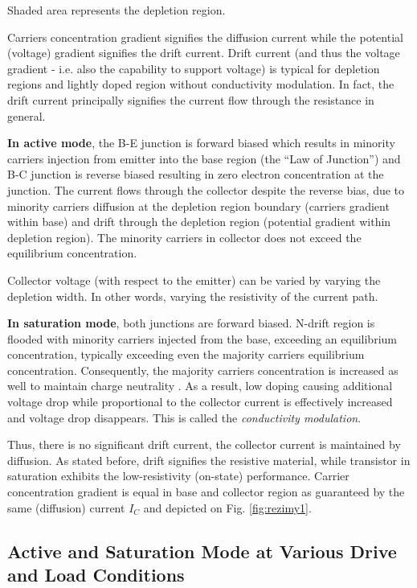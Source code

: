 \documentclass[conference]{IEEEtran}
\begin{document}
Shaded area represents the depletion region.

Carriers concentration gradient  signifies the diffusion current while the potential (voltage) gradient signifies the drift current. Drift current (and thus the voltage gradient - i.e. also the capability to support voltage) is typical for depletion regions and lightly doped region without conductivity modulation. In fact, the drift current principally signifies the current flow through the resistance in general.

\textbf{In active mode}, the B-E junction is forward biased which results in minority carriers injection from emitter into the base region (the ``Law of Junction'') and B-C junction is reverse biased resulting in zero electron concentration at the junction. The current flows through the collector despite the reverse bias, due to minority carriers diffusion at the depletion region boundary (carriers gradient within base) and drift through the depletion region (potential gradient within depletion region). The minority carriers in collector does not exceed the equilibrium concentration.

Collector voltage (with respect to the emitter) can be varied by varying the depletion width. In other words, varying the resistivity of the current path.

\textbf{In saturation mode}, both junctions are forward biased. N-drift region is flooded with minority carriers injected from the base, exceeding an equilibrium concentration, typically exceeding even the majority carriers equilibrium concentration. Consequently, the majority carriers concentration is increased as well to maintain charge neutrality \cite{baliga}. As a result, low doping causing additional voltage drop while proportional to the collector current is effectively increased and voltage drop disappears. This is called the \textit{conductivity modulation}.

Thus, there is no significant drift current, the collector current is maintained by diffusion. As stated before, drift signifies the resistive material, while transistor in saturation exhibits the low-resistivity (on-state) performance. Carrier concentration gradient is equal in base and collector region as guaranteed by the same (diffusion) current $I_C$ and depicted on Fig. \ref{fig:rezimy1}.


\subsection{Active and Saturation Mode at Various Drive and Load Conditions} \label{sec:rezimy2}
\end{document}

